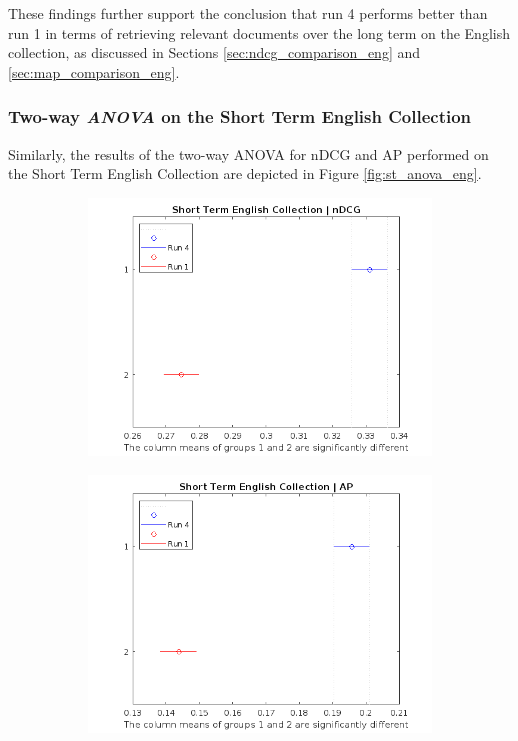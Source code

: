 These findings further support the conclusion that run 4 performs better than run 1 in terms of retrieving relevant documents over the long term on the English collection, as discussed in Sections \ref{sec:ndcg_comparison_eng} and \ref{sec:map_comparison_eng}.


\newpage
\enlargethispage{5\baselineskip}
\subsubsection{Two-way \textit{ANOVA} on the Short Term English Collection}

Similarly, the results of the two-way \ac{ANOVA} for \ac{nDCG} and \ac{AP} performed on the Short Term English Collection are depicted in Figure \ref{fig:st_anova_eng}.

\begin{figure}[!h]
    \centering
    \begin{subfigure}[b]{0.49\textwidth}
        \includegraphics[width=\textwidth]{figure/StatisticalAnalysis/ANOVA 2/ndcg-st-en.jpeg}
        \label{fig:st_anova_eng_ndcg}
    \end{subfigure}
    \hfill
    \begin{subfigure}[b]{0.49\textwidth}
        \includegraphics[width=\textwidth]{figure/StatisticalAnalysis/ANOVA 2/ap-st-en.jpeg}

\end{subfigure}
\end{figure}
